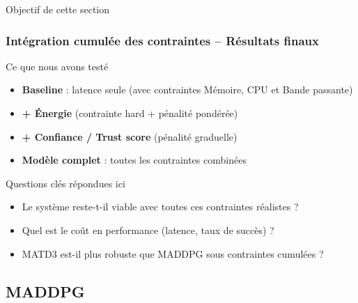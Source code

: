 \documentclass[aspectratio=169]{beamer}
\begin{document}
\begin{frame}{Objectif de cette section}
\frametitle{Intégration cumulée des contraintes – Résultats finaux}

\begin{block}{Ce que nous avons testé}
\begin{itemize}
    \item \textbf{Baseline} : latence seule (avec contraintes Mémoire, CPU et Bande passante)
    \item \textbf{+ Énergie} (contrainte hard + pénalité pondérée)
    \item \textbf{+ Confiance / Trust score} (pénalité graduelle)
    \item \textbf{Modèle complet} : toutes les contraintes combinées
\end{itemize}
\end{block}

\bigskip

\begin{alertblock}{Questions clés répondues ici}
\begin{itemize}
    \item Le système reste-t-il viable avec toutes ces contraintes réalistes ?
    \item Quel est le coût en performance (latence, taux de succès) ?
    \item MATD3 est-il plus robuste que MADDPG sous contraintes cumulées ?
\end{itemize}
\end{alertblock}
\end{frame}

\subsection{MADDPG}
\end{document}
